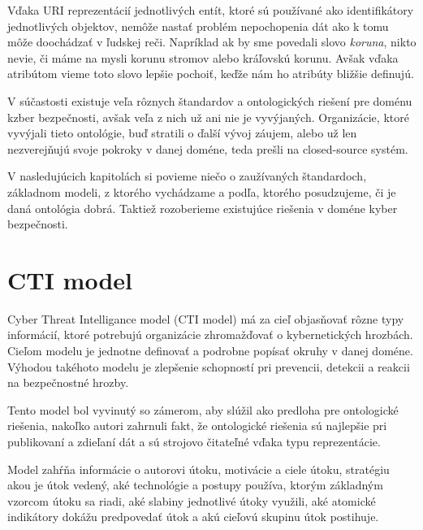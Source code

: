\documentclass[12pt, a4paper, oneside]{book}
\begin{document}
Vďaka URI reprezentácií jednotlivých entít, ktoré sú používané ako identifikátory jednotlivých objektov, nemôže nastať problém nepochopenia dát ako k tomu môže doochádzať v ľudskej reči. Napríklad ak by sme povedali slovo \textit{koruna}, nikto nevie, či máme na mysli korunu stromov alebo kráľovskú korunu. Avšak vďaka atribútom vieme toto slovo lepšie pochoiť, keďže nám ho atribúty bližšie definujú.


V súčastosti existuje veľa rôznych štandardov a ontologických riešení pre doménu kzber bezpečnosti, avšak veľa z nich už ani nie je vyvýjaných. Organizácie, ktoré vyvýjali tieto ontológie, buď stratili o ďalší vývoj záujem, alebo už len nezverejňujú svoje pokroky v danej doméne, teda prešli na closed-source systém.


V nasledujúcich kapitolách si povieme niečo o zaužívaných štandardoch, základnom modeli, z ktorého vychádzame a podľa, ktorého posudzujeme, či je daná ontológia dobrá. Taktiež rozoberieme existujúce riešenia v doméne kyber bezpečnosti.

\section{CTI model}
Cyber Threat Intelligance model \citep{MavroeidisB17} (CTI model) má za cieľ objasňovať rôzne typy informácií, ktoré potrebujú organizácie zhromažďovať o kybernetických hrozbách. Cieľom modelu je jednotne definovať a podrobne popísať okruhy v danej doméne. Výhodou takéhoto modelu je zlepšenie schopností pri prevencii, detekcii a reakcii na bezpečnostné hrozby.


Tento model bol vyvinutý so zámerom, aby slúžil ako predloha pre ontologické riešenia, nakoľko autori zahrnuli fakt, že ontologické riešenia sú najlepšie pri publikovaní a zdieľaní dát a sú strojovo čitateľné vďaka typu reprezentácie.


Model zahŕňa informácie o autorovi útoku, motivácie a ciele útoku, stratégiu akou je útok vedený, aké technológie a postupy používa, ktorým základným vzorcom útoku sa riadi, aké slabiny jednotlivé útoky využili, aké atomické indikátory dokážu predpovedať útok a akú cieľovú skupinu útok postihuje.
\end{document}
